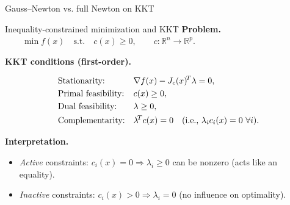 \begin{frame}{Gauss--Newton vs. full Newton on KKT}


\vspace{0.6em}



\end{frame}



\begin{frame}{Inequality-constrained minimization and KKT}
\textbf{Problem.} $\quad \quad \min f(x)\quad\text{s.t.}\quad c(x)\ge 0,  \quad \quad c:\mathbb{R}^n\to\mathbb{R}^p$.

\textbf{KKT conditions (first-order).}

$$
\begin{aligned}
&\text{Stationarity:} && \nabla f(x)-J_c(x)^{\!T}\lambda=0,\\
&\text{Primal feasibility:} && c(x)\ge 0,\\
&\text{Dual feasibility:} && \lambda\ge 0,\\
&\text{Complementarity:} && \lambda^{\!T}c(x)=0\quad(\text{i.e., }\lambda_i c_i(x)=0\ \forall i).
\end{aligned}
$$

\textbf{Interpretation.}
\begin{itemize}
\item \emph{Active} constraints: $c_i(x)=0 \Rightarrow \lambda_i\ge 0$ can be nonzero (acts like an equality).
\item \emph{Inactive} constraints: $c_i(x)>0 \Rightarrow \lambda_i=0$ (no influence on optimality).
\end{itemize}
\end{frame}




